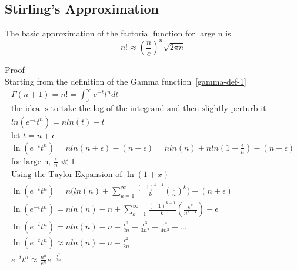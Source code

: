 \documentclass[a4paper]{article}
\begin{document}
    \subsection{Stirling's Approximation}\label{subsec:stirling's-approximation}
    \begin{theorem}
        The basic approximation of the factorial function for large n is
        \begin{equation}
            \boxed{
                n! \approx (\frac{n}{e})^n \sqrt{2\pi n}
            }\label{eq:equation27}
        \end{equation}

        Proof
        \\
        Starting from the definition of the Gamma function~\ref{gamma-def-1}
        \begin{gather*}
            \Gamma(n+1) = n! = \int_{0}^{\infty} e^{-t} t^{n} dt
            \\
            \text{the idea is to take the log of the integrand and then slightly perturb it}
            \\
            ln(e^{-t} t^{n}) = n ln(t) - t
            \\
            \text{let $t=n + \epsilon$}
            \\
            \ln(e^{-t} t^{n}) = n ln(n + \epsilon) - (n + \epsilon)
            =
            n ln(n) + n ln(1 + \frac{\epsilon}{n}) - (n + \epsilon)
            \\
            \text{for large n, $\frac{\epsilon}{n} \ll 1$}
            \\
            \text{Using the Taylor-Expansion of $\ln(1+x)$}
            \\
            \ln(e^{-t} t^{n})
            =
            n \Big( ln(n) +  \sum_{k=1}^{\infty} \frac{(-1)^{k+1}}{k} (\frac{\epsilon}{n})^k \Big) - (n + \epsilon)
            \\
            \ln(e^{-t} t^{n})
            =
            n ln(n) -n + \sum_{k=1}^{\infty} \frac{(-1)^{k+1}}{k} (\frac{\epsilon^k}{n^{k-1}}) - \epsilon
            \\
            \ln(e^{-t} t^{n})
            =
            n ln(n) - n - \frac{\epsilon^2}{2n} + \frac{\epsilon^3}{3n^2}
            - \frac{\epsilon^4}{4n^3} + \dots
            \\
            \ln(e^{-t} t^{n})
            \approx
            n ln(n) - n - \frac{\epsilon^2}{2n}
            \\
            e^{-t} t^{n}
            \approx
            \frac{n^n}{e^n} e^{-\frac{\epsilon^2}{2n}}

\end{gather*}
\end{theorem}
\end{document}
